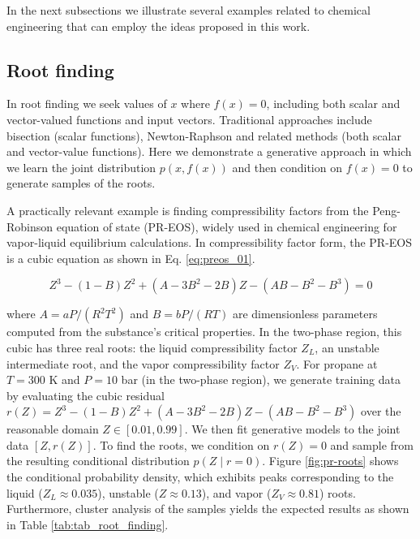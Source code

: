 \documentclass{achemso}
\begin{document}
In the next subsections we illustrate several examples related to chemical engineering that can employ the ideas proposed in this work.

\subsection{Root finding \label{sec-root-finding}}

In root finding we seek values of \(x\) where \(f(x) = 0\), including both scalar and vector-valued functions and input vectors. Traditional approaches include bisection (scalar functions), Newton-Raphson and related methods (both scalar and vector-value functions). Here we demonstrate a generative approach in which we learn the joint distribution \(p(x, f(x))\) and then condition on \(f(x) = 0\) to generate samples of the roots.

A practically relevant example is finding compressibility factors from the Peng-Robinson equation of state (PR-EOS), widely used in chemical engineering for vapor-liquid equilibrium calculations. In compressibility factor form, the PR-EOS is a cubic equation as shown in Eq. \ref{eq:preos_01}.

\begin{equation} \label{eq:preos_01}
Z^3 - (1-B)Z^2 + (A - 3B^2 - 2B)Z - (AB - B^2 - B^3) = 0
\end{equation}

\noindent where \(A = aP/(R^2T^2)\) and \(B = bP/(RT)\) are dimensionless parameters computed from the substance's critical properties. In the two-phase region, this cubic has three real roots: the liquid compressibility factor \(Z_L\), an unstable intermediate root, and the vapor compressibility factor \(Z_V\). For propane at \(T = 300\) K and \(P = 10\) bar (in the two-phase region), we generate training data by evaluating the cubic residual \(r(Z) = Z^3 - (1-B)Z^2 + (A - 3B^2 - 2B)Z - (AB - B^2 - B^3)\) over the reasonable domain \(Z \in [0.01, 0.99]\). We then fit generative models to the joint data \([Z, r(Z)]\). To find the roots, we condition on \(r(Z) = 0\) and sample from the resulting conditional distribution \(p(Z \mid r = 0)\). Figure \ref{fig:pr-roots} shows the conditional probability density, which exhibits peaks corresponding to the liquid (\(Z_L \approx 0.035\)), unstable (\(Z \approx 0.13\)), and vapor (\(Z_V \approx 0.81\)) roots. Furthermore, cluster analysis of the samples yields the expected results as shown in Table \ref{tab:tab_root_finding}.
\end{document}
